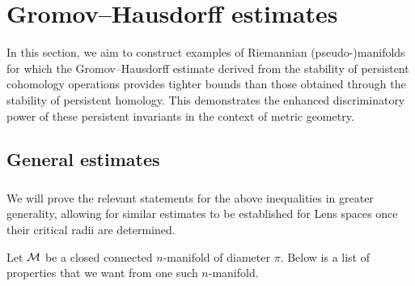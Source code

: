 
\section{Gromov--Hausdorff estimates}\label{s:gh_estimates}

In this section, we aim to construct examples of Riemannian (pseudo-)manifolds for which the Gromov--Hausdorff estimate derived from the stability of persistent cohomology operations provides tighter bounds than those obtained through the stability of persistent homology.
This demonstrates the enhanced discriminatory power of these persistent invariants in the context of metric geometry.

%
%

\subsection{General estimates}\label{ss:genberal_distance_comparison}

\subsubsection{}

We will prove the relevant statements for the above inequalities in greater generality, allowing for similar estimates to be established for Lens spaces once their critical radii are determined.

Let $\mathcal{M}$ be a closed connected \(n\)-manifold of diameter $\pi$.
Below is a list of properties that we want from one such \(n\)-manifold.

